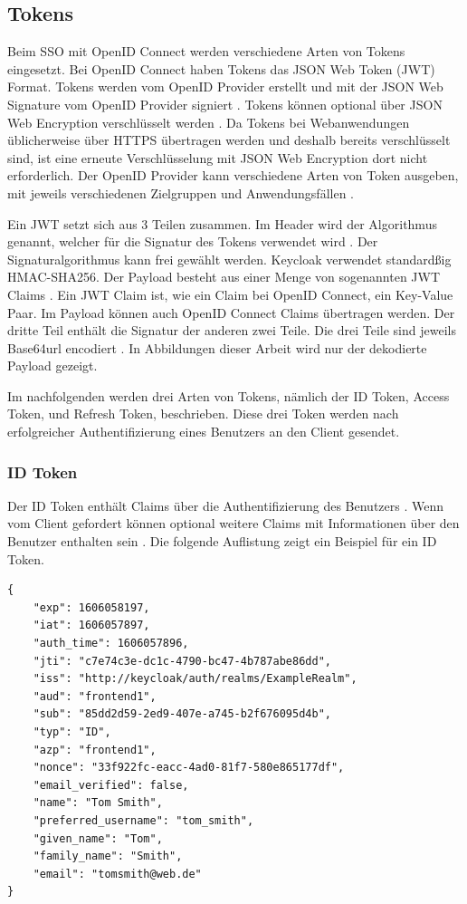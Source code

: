\subsection{Tokens} \label{EB_Tokens}

Beim SSO mit OpenID Connect werden verschiedene Arten von Tokens eingesetzt. Bei OpenID Connect haben Tokens das JSON Web Token (JWT) Format. Tokens werden vom OpenID Provider erstellt und mit der JSON Web Signature vom OpenID Provider signiert \cite{EB5}. Tokens können optional über JSON Web Encryption verschlüsselt werden \cite{EB5}. Da Tokens bei Webanwendungen üblicherweise über HTTPS übertragen werden und deshalb bereits verschlüsselt sind, ist eine erneute Verschlüsselung mit JSON Web Encryption dort nicht erforderlich. Der OpenID Provider kann verschiedene Arten von Token ausgeben, mit jeweils verschiedenen Zielgruppen und Anwendungsfällen \cite{EB19}.

Ein JWT setzt sich aus 3 Teilen zusammen. Im Header wird der Algorithmus genannt, welcher für die Signatur des Tokens verwendet wird \cite{EB5}. Der Signaturalgorithmus kann frei gewählt werden. Keycloak verwendet standardßig HMAC-SHA256. Der Payload besteht aus einer Menge von sogenannten JWT Claims \cite{EB5}. Ein JWT Claim ist, wie ein Claim bei OpenID Connect, ein Key-Value Paar. Im Payload können auch OpenID Connect Claims übertragen werden. Der dritte Teil enthält die Signatur der anderen zwei Teile. Die drei Teile sind jeweils Base64url encodiert \cite{EB5}. In Abbildungen dieser Arbeit wird nur der dekodierte Payload gezeigt.

Im nachfolgenden werden drei Arten von Tokens, nämlich der ID Token, Access Token, und Refresh Token, beschrieben. Diese drei Token werden nach erfolgreicher Authentifizierung eines Benutzers an den Client gesendet.

\subsubsection{ID Token}

Der ID Token enthält Claims über die Authentifizierung des Benutzers \cite{EB58}. Wenn vom Client gefordert können optional weitere Claims mit Informationen über den Benutzer enthalten sein \cite{EB58}. Die folgende Auflistung zeigt ein Beispiel für ein ID Token.

\begin{lstlisting}[caption=Beispiel ID Token, captionpos=b]
{
	"exp": 1606058197,
	"iat": 1606057897,
	"auth_time": 1606057896,
	"jti": "c7e74c3e-dc1c-4790-bc47-4b787abe86dd",
	"iss": "http://keycloak/auth/realms/ExampleRealm",
	"aud": "frontend1",
	"sub": "85dd2d59-2ed9-407e-a745-b2f676095d4b",
	"typ": "ID",
	"azp": "frontend1",
	"nonce": "33f922fc-eacc-4ad0-81f7-580e865177df",
	"email_verified": false,
	"name": "Tom Smith",
	"preferred_username": "tom_smith",
	"given_name": "Tom",
	"family_name": "Smith",
	"email": "tomsmith@web.de"
}
\end{lstlisting}

